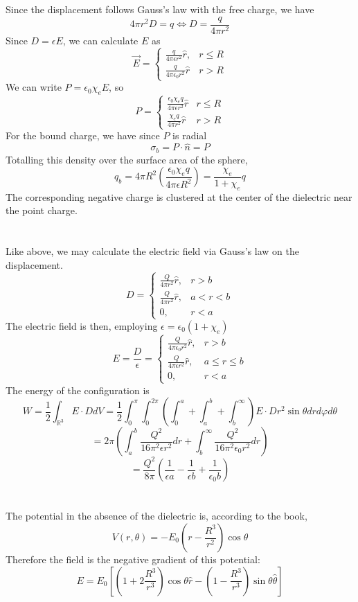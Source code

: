 \documentclass{article}
\begin{document}
\section{}
Since the displacement follows Gauss's law with the free charge, we have
\[4\pi r^2D=q\Leftrightarrow D=\frac{q}{4\pi r^2}\]
Since $D=\epsilon E$, we can calculate $E$ as
\[\vec{E}=\begin{cases}
    \frac{q}{4\pi\epsilon r^2}\hat{r}, & r\leq R \\
    \frac{q}{4\pi\epsilon_0 r^2}\hat{r} & r> R
  \end{cases}\]
We can write $P=\epsilon_0\chi_eE$, so
\[P=\begin{cases}
    \frac{\epsilon_0\chi_e q}{4\pi\epsilon r^2}\hat{r}  & r \leq R \\
    \frac{\chi_e q}{4\pi r^2}\hat{r} & r> R
  \end{cases}\]
For the bound charge, we have since $P$ is radial
\[\sigma_b=P\cdot\hat{n}=P\]
Totalling this density over the surface area of the sphere, \[q_b=4\pi R^2\left(  \frac{\epsilon_0\chi_e q}{4\pi\epsilon R^2}\right)=\frac{\chi_e}{1+\chi_e}q\]
The corresponding negative charge is clustered at the center of the dielectric near the point charge.

\section{}
Like above, we may calculate the electric field via Gauss's law on the displacement.
\[D=\begin{cases}
    \frac{Q}{4\pi r^2}\hat{r}, & r > b \\
    \frac{Q}{4\pi r^2}\hat{r}, & a < r < b \\
    0, & r < a
  \end{cases}\]
The electric field is then, employing $\epsilon=\epsilon_0(1+\chi_e)$
\[E=\frac{D}{\epsilon}=\begin{cases}
    \frac{Q}{4\pi\epsilon_0 r^2}\hat{r}, & r > b \\
    \frac{Q}{4\pi\epsilon r^2}\hat{r}, & a \leq r \leq b \\
    0, & r < a
  \end{cases}\]
The energy of the configuration is
\[W=\frac{1}{2}\int_{\mathbb{R}^3}E\cdot DdV=\frac{1}{2}\int_0^\pi\int_0^{2\pi}\left( \int_0^a+\int_a^b+\int_b^\infty\right)E\cdot Dr^2\sin\theta drd\varphi d\theta\]
\[=2\pi\left( \int_a^b\frac{Q^2}{16\pi^2\epsilon r^2}dr+\int_b^\infty\frac{Q^2}{16\pi^2\epsilon_0r^2}dr \right)\]
\[=\frac{Q^2}{8\pi}\left(\frac{1}{\epsilon a}-\frac{1}{\epsilon b}+\frac{1}{\epsilon_0 b} \right)\]

\section{}
The potential in the absence of the dielectric is, according to the book,
\[V(r,\theta)=-E_0\left( r-\frac{R^3}{r^2} \right)\cos\theta\]
Therefore the field is the negative gradient of this potential:
\[E=E_0\left[\left(1+2\frac{R^3}{r^3}\right)\cos\theta\hat{r}-\left(1-\frac{R^3}{r^3}\right)\sin\theta\hat{\theta} \right]\]
\end{document}
